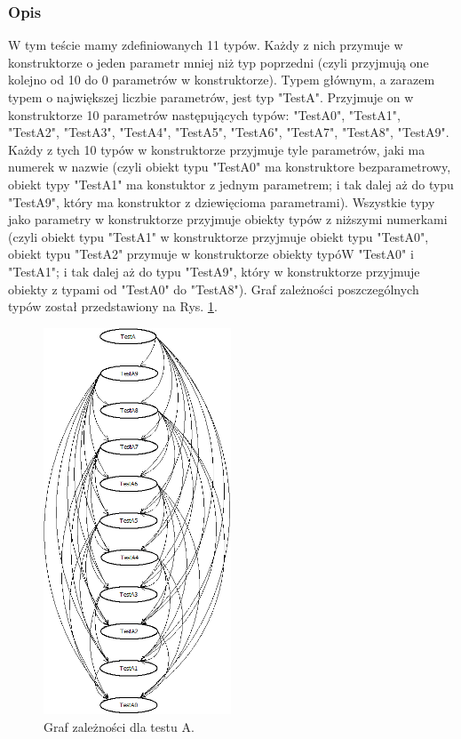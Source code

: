 \documentclass[12pt]{article}
\begin{document}
\subsubsection{Opis}
W tym teście mamy zdefiniowanych 11 typów. Każdy z nich przymuje w konstruktorze o jeden parametr mniej niż typ poprzedni (czyli przyjmują one kolejno od 10 do 0 parametrów w konstruktorze). Typem głównym, a zarazem typem o największej liczbie parametrów, jest typ "TestA". Przyjmuje on w konstruktorze 10 parametrów następujących typów: "TestA0", "TestA1", "TestA2", "TestA3", "TestA4", "TestA5", "TestA6", "TestA7", "TestA8", "TestA9". Każdy z tych 10 typów w konstruktorze przyjmuje tyle parametrów, jaki ma numerek w nazwie (czyli obiekt typu "TestA0" ma konstruktore bezparametrowy, obiekt typy "TestA1" ma konstuktor z jednym parametrem; i tak dalej aż do typu "TestA9", który ma konstruktor z dziewięcioma parametrami). Wszystkie typy jako parametry w konstruktorze przyjmuje obiekty typów z niższymi numerkami (czyli obiekt typu "TestA1" w konstruktorze przyjmuje obiekt typu "TestA0", obiekt typu "TestA2" przymuje w konstruktorze obiekty typóW "TestA0" i "TestA1";  i tak dalej aż do typu "TestA9", który w konstruktorze przyjmuje obiekty z typami od "TestA0" do "TestA8"). Graf zależności poszczególnych typów został przedstawiony na Rys. \ref{fig:testA}.\\
\begin{figure}[H]
	\begin{center}
  		\includegraphics[height=11.5cm]{TestA.png}
  		\caption{Graf zależności dla testu A.}
  		\label{fig:testA}
	\end{center}
\end{figure}
\end{document}

